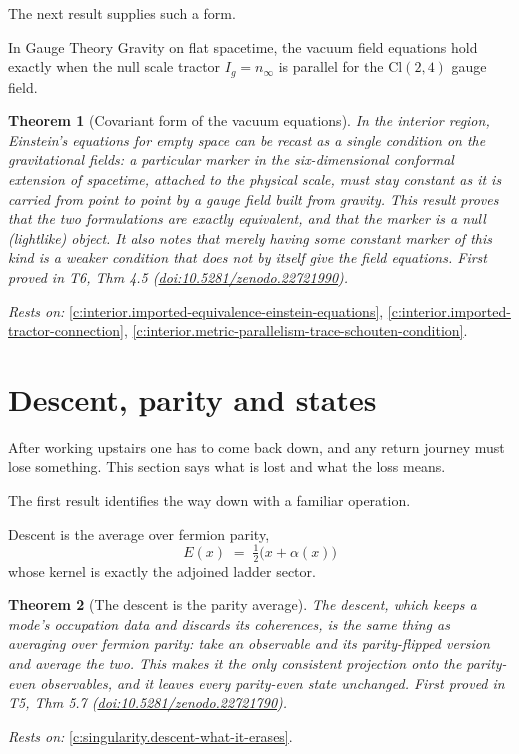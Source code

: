 \documentclass[11pt]{article}
\newtheorem{theorem}{Theorem}[section]
\theoremstyle{definition}
\theoremstyle{plain}
\providecommand{\Cl}{}\renewcommand{\Cl}{\mathrm{Cl}}
\providecommand{\nInf}{}\renewcommand{\nInf}{n_\infty}
\begin{document}
The next result supplies such a form.

In Gauge Theory Gravity on flat spacetime, the vacuum field equations hold exactly when the null scale tractor $I_g = \nInf$ is parallel for the $\Cl(2,4)$ gauge field.

\begin{theorem}[Covariant form of the vacuum equations]\label{c:interior.covariant-form-vacuum-equations}
In the interior region, Einstein's equations for empty space can be recast as a single condition on the gravitational fields: a particular marker in the six-dimensional conformal extension of spacetime, attached to the physical scale, must stay constant as it is carried from point to point by a gauge field built from gravity. This result proves that the two formulations are exactly equivalent, and that the marker is a null (lightlike) object. It also notes that merely having some constant marker of this kind is a weaker condition that does not by itself give the field equations.
\emph{First proved in} T6, Thm 4.5 (\href{https://doi.org/10.5281/zenodo.22721990}{doi:10.5281/zenodo.22721990}).
\end{theorem}
\noindent\emph{Rests on:} \ref{c:interior.imported-equivalence-einstein-equations}, \ref{c:interior.imported-tractor-connection}, \ref{c:interior.metric-parallelism-trace-schouten-condition}.

\section{Descent, parity and states}

After working upstairs one has to come back down, and any return journey must lose something. This section says what is lost and what the loss means.

The first result identifies the way down with a familiar operation.

Descent is the average over fermion parity, \[ E(x) \;=\; \tfrac12\bigl(x + \alpha(x)\bigr) \] whose kernel is exactly the adjoined ladder sector.

\begin{theorem}[The descent is the parity average]\label{c:singularity.descent-parity-average}
The descent, which keeps a mode's occupation data and discards its coherences, is the same thing as averaging over fermion parity: take an observable and its parity-flipped version and average the two. This makes it the only consistent projection onto the parity-even observables, and it leaves every parity-even state unchanged.
\emph{First proved in} T5, Thm 5.7 (\href{https://doi.org/10.5281/zenodo.22721790}{doi:10.5281/zenodo.22721790}).
\end{theorem}
\noindent\emph{Rests on:} \ref{c:singularity.descent-what-it-erases}.
\end{document}
